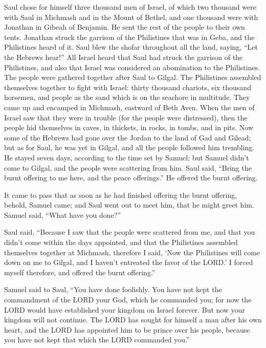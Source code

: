 \quad \myverse{}Saul chose for himself three thousand men of Israel, of which
two thousand were with Saul in Michmash and in the Mount of Bethel, and one thousand were with Jonathan
in Gibeah of Benjamin. He sent the rest of the people to their own tents.
\myverse{}Jonathan struck the garrison of the Philistines that was in Geba, and the Philistines
heard of it. Saul blew the shofar throughout all the land, saying, “Let the Hebrews hear!”
\myverse{}All Israel heard that Saul had struck the garrison of the Philistines, and
also that Israel was considered an abomination to the Philistines. The people were gathered together after
Saul to Gilgal.
\myverse{}The Philistines assembled themselves together to fight with Israel: thirty
thousand chariots, six thousand horsemen, and people as the sand which is on the seashore in multitude.
They came up and encamped in Michmash, eastward of Beth Aven.
\myverse{}When the men of Israel saw that they were in trouble (for the people were distressed),
then the people hid themselves in caves, in thickets, in rocks, in tombs, and in pits.
\myverse{}Now some of the Hebrews had gone over the Jordan to the land of Gad and Gilead;
but as for Saul, he was yet in Gilgal, and all the people followed him trembling.
\myverse{}He stayed seven days, according to the time set by Samuel; but Samuel didn’t
come to Gilgal, and the people were scattering from him.
\myverse{}Saul said, “Bring the burnt offering to me here, and the peace offerings.”
He offered the burnt offering.

\myverse{}It came to pass that as soon as he had finished offering the
burnt offering, behold, Samuel came; and Saul went out to meet him, that he might greet him.
\myverse{}Samuel said, “What have you done?”

Saul said, “Because I saw that the people were scattered from me, and that you didn’t come
within the days appointed, and that the Philistines assembled themselves together at Michmash,
\myverse{}therefore I said, ‘Now the Philistines will come down on me to Gilgal, and
I haven’t entreated the favor of the LORD.’ I forced myself therefore, and offered the burnt offering.”

\myverse{}Samuel said to Saul, “You have done foolishly. You have not
kept the commandment of the LORD your God, which he commanded you; for now the LORD would have established
your kingdom on Israel forever.
\myverse{}But now your kingdom will not continue. The LORD has sought for himself a
man after his own heart, and the LORD has appointed him to be prince over his people, because you have
not kept that which the LORD commanded you.”

